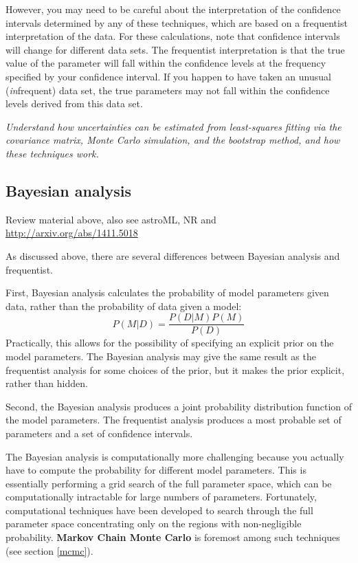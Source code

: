 \documentclass{article}
\newcommand{\test}[1]{%
    \begin{center}
        \colorbox{hl}{\parbox{0.9\textwidth}{\emph{\centering #1}}}
    \end{center}}
\begin{document}
However, you may need to be careful about the interpretation of the confidence
intervals determined by any of these techniques, which are based on a
frequentist interpretation of the data. For these calculations, note that
confidence intervals will change for different data sets. The frequentist
interpretation is that the true value of the parameter will fall within the
confidence levels at the frequency specified by your confidence interval. If
you happen to have taken an unusual (\emph{in}frequent) data set, the true
parameters may not fall within the confidence levels derived from
this data set.

\test{Understand how uncertainties can be estimated from least-squares
fitting via the covariance matrix, Monte Carlo simulation, and the
bootstrap method, and how these techniques work.}

\subsection{Bayesian analysis}
Review material above, also see astroML, NR and
\url{http://arxiv.org/abs/1411.5018}

As discussed above, there are several differences between Bayesian analysis
and frequentist.

First, Bayesian analysis calculates the probability of model
parameters given data, rather than the probability of data given a model:
\[
    {P(M|D)} = \frac{P(D|M)P(M)}{P(D)}
    \]
Practically, this allows for the possibility of specifying an explicit
prior on the model parameters. The Bayesian analysis may give the same
result as the frequentist analysis for some choices of the prior, but
it makes the prior explicit, rather than hidden.

Second, the Bayesian analysis produces a joint probability distribution
function of the model parameters. The frequentist analysis produces a most
probable set of parameters and a set of confidence intervals.

The Bayesian analysis is computationally more challenging because you actually
have to compute the probability for different model parameters. This is
essentially performing a grid search of the full parameter space, which can be
computationally intractable for large numbers of parameters. Fortunately,
computational techniques have been developed to search through the full
parameter space concentrating only on the regions with non-negligible
probability. \textbf{Markov Chain Monte Carlo} is foremost among such
techniques (see section \ref{mcmc}).
\end{document}
